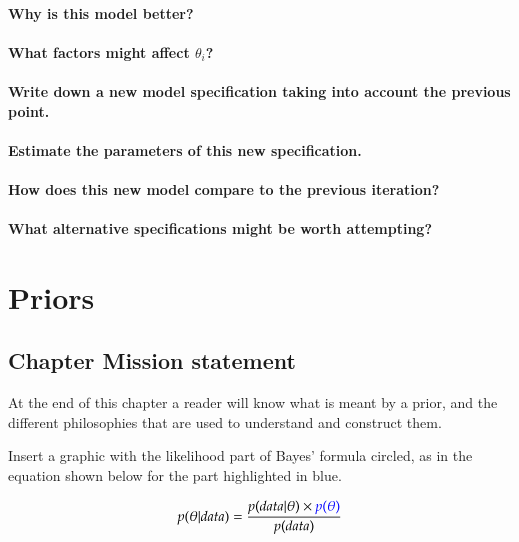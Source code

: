 \documentclass[11pt,fullpage]{book}
\begin{document}
\subsubsection{Why is this model better?}
\subsubsection{What factors might affect $\theta_i$?}
\subsubsection{Write down a new model specification taking into account the previous point.}
\subsubsection{Estimate the parameters of this new specification.}
\subsubsection{How does this new model compare to the previous iteration?}
\subsubsection{What alternative specifications might be worth attempting?}

\chapter{Priors}\label{chap:Prior}
\section{Chapter Mission statement}
At the end of this chapter a reader will know what is meant by a prior, and the different philosophies that are used to understand and construct them. 

Insert a graphic with the likelihood part of Bayes' formula circled, as in the equation shown below for the part highlighted in blue.

\begin{equation}
p(\theta|data) = \frac{p(data|\theta)\times {\color{blue}p(\theta)}}{p(data)}
\end{equation}\label{eq:Prior_BayesHighlighted}
\end{document}
